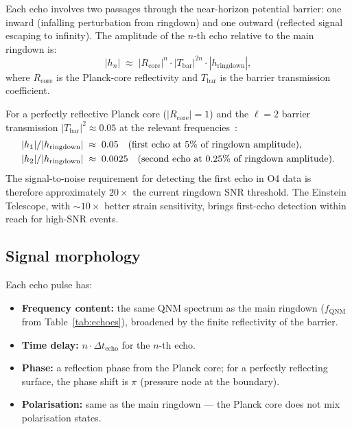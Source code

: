 \documentclass[12pt]{article}
\newcommand{\Dt}{\Delta t_{\mathrm{echo}}}
\begin{document}
Each echo involves two passages through the near-horizon potential barrier:
one inward (infalling perturbation from ringdown) and one outward (reflected
signal escaping to infinity).  The amplitude of the $n$-th echo relative
to the main ringdown is:
\begin{equation}
  |h_n| \;\approx\; |R_{\mathrm{core}}|^n \cdot |T_{\mathrm{bar}}|^{2n}
  \cdot |h_{\mathrm{ringdown}}|,
  \label{eq:amplitude}
\end{equation}
where $R_{\mathrm{core}}$ is the Planck-core reflectivity and
$T_{\mathrm{bar}}$ is the barrier transmission coefficient.

For a perfectly reflective Planck core ($|R_{\mathrm{core}}| = 1$) and
the $\ell = 2$ barrier transmission $|T_{\mathrm{bar}}|^2 \approx 0.05$
at the relevant frequencies~\cite{berti2009}:
\begin{align}
  |h_1|/|h_{\mathrm{ringdown}}| &\;\approx\; 0.05
  \quad (\text{first echo at 5\% of ringdown amplitude}), \notag\\
  |h_2|/|h_{\mathrm{ringdown}}| &\;\approx\; 0.0025
  \quad (\text{second echo at 0.25\% of ringdown amplitude}).
  \label{eq:amp_values}
\end{align}
The signal-to-noise requirement for detecting the first echo in O4 data is
therefore approximately $20\times$ the current ringdown SNR threshold.  The
Einstein Telescope, with $\sim\!10\times$ better strain sensitivity, brings
first-echo detection within reach for high-SNR events.

\subsection{Signal morphology}

Each echo pulse has:
\begin{itemize}[noitemsep]
  \item \textbf{Frequency content:} the same QNM spectrum as the main
    ringdown ($f_{\mathrm{QNM}}$ from Table~\ref{tab:echoes}), broadened
    by the finite reflectivity of the barrier.
  \item \textbf{Time delay:} $n\cdot\Dt$ for the $n$-th echo.
  \item \textbf{Phase:} a reflection phase from the Planck core;
    for a perfectly reflecting surface, the phase shift is $\pi$
    (pressure node at the boundary).
  \item \textbf{Polarisation:} same as the main ringdown — the Planck
    core does not mix polarisation states.
\end{itemize}
\end{document}
